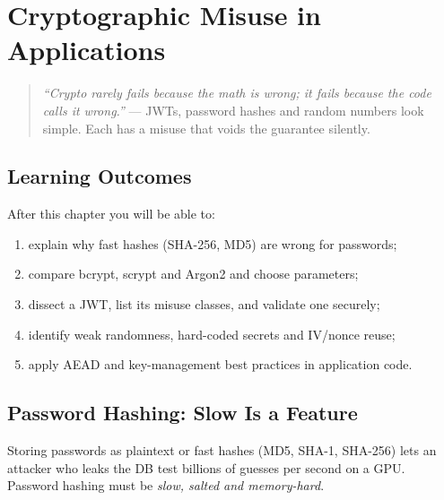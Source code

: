 \chapter{Cryptographic Misuse in Applications}
\label{ch:crypto-app}

\begin{quote}
\emph{``Crypto rarely fails because the math is wrong; it fails because the code calls it wrong.''} --- JWTs, password hashes and random numbers look simple. Each has a misuse that voids the guarantee silently.
\end{quote}

\noindent{}
\vspace{0.4em}

\section*{Learning Outcomes}
After this chapter you will be able to:
\begin{enumerate}[label=(L\arabic*)]
    \item explain why fast hashes (SHA-256, MD5) are wrong for passwords;
    \item compare bcrypt, scrypt and Argon2 and choose parameters;
    \item dissect a JWT, list its misuse classes, and validate one securely;
    \item identify weak randomness, hard-coded secrets and IV/nonce reuse;
    \item apply AEAD and key-management best practices in application code.
\end{enumerate}

\section{Password Hashing: Slow Is a Feature}
\label{sec:pw-hashing}
Storing passwords as plaintext or fast hashes (MD5, SHA-1, SHA-256) lets an attacker who leaks the DB test billions of guesses per second on a GPU. Password hashing must be \emph{slow, salted and memory-hard}.

